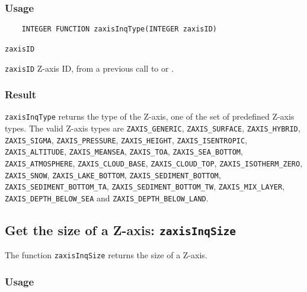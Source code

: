 \subsubsection*{Usage}

\begin{verbatim}
    INTEGER FUNCTION zaxisInqType(INTEGER zaxisID)
\end{verbatim}

\hspace*{4mm}\begin{minipage}[]{15cm}
\begin{deflist}{\texttt{zaxisID}\ }
\item[\texttt{zaxisID}]
Z-axis ID, from a previous call to {} or {}.

\end{deflist}
\end{minipage}

\subsubsection*{Result}

{\texttt{zaxisInqType}} returns the type of the Z-axis,
one of the set of predefined {\CDI} Z-axis types.
The valid {\CDI} Z-axis types are {\texttt{ZAXIS\_GENERIC}}, {\texttt{ZAXIS\_SURFACE}},
{\texttt{ZAXIS\_HYBRID}}, {\texttt{ZAXIS\_SIGMA}}, {\texttt{ZAXIS\_PRESSURE}}, {\texttt{ZAXIS\_HEIGHT}},
{\texttt{ZAXIS\_ISENTROPIC}}, {\texttt{ZAXIS\_ALTITUDE}}, {\texttt{ZAXIS\_MEANSEA}}, {\texttt{ZAXIS\_TOA}},
{\texttt{ZAXIS\_SEA\_BOTTOM}}, {\texttt{ZAXIS\_ATMOSPHERE}}, {\texttt{ZAXIS\_CLOUD\_BASE}},
{\texttt{ZAXIS\_CLOUD\_TOP}}, {\texttt{ZAXIS\_ISOTHERM\_ZERO}}, {\texttt{ZAXIS\_SNOW}},
{\texttt{ZAXIS\_LAKE\_BOTTOM}}, {\texttt{ZAXIS\_SEDIMENT\_BOTTOM}}, {\texttt{ZAXIS\_SEDIMENT\_BOTTOM\_TA}},
{\texttt{ZAXIS\_SEDIMENT\_BOTTOM\_TW}}, {\texttt{ZAXIS\_MIX\_LAYER}},
{\texttt{ZAXIS\_DEPTH\_BELOW\_SEA}} and {\texttt{ZAXIS\_DEPTH\_BELOW\_LAND}}.



\subsection{Get the size of a Z-axis: \texttt{zaxisInqSize}}
\label{zaxisInqSize}

The function {\texttt{zaxisInqSize}} returns the size of a Z-axis.

\subsubsection*{Usage}

